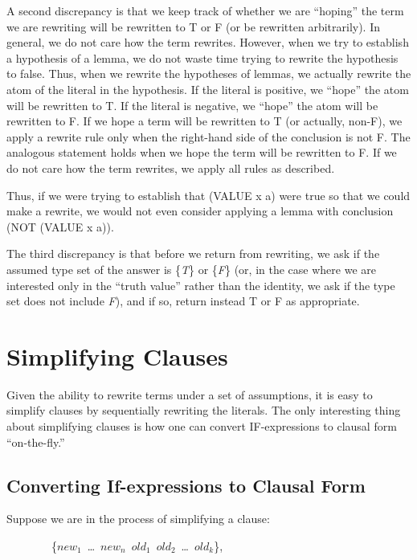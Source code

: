 \documentclass[11pt]{book}
\newenvironment{pubasis}{\begin{flushleft}\ttfamily\small}{\normalsize\rmfamily\end{flushleft}}
\newcommand{\pubinlineunderline}[1]{\emph{#1}}
\newcommand{\pubdefaulttextsize}{\large}
\begin{document}
A second discrepancy is that we
keep track of whether we are ``hoping'' the term we are rewriting will be
rewritten to T or F (or be rewritten arbitrarily).  In general, we do not
care how the term rewrites.  However, when we try to establish 
a hypothesis of a lemma, we do not waste time trying 
to rewrite the hypothesis to false.
Thus, when we rewrite the hypotheses of lemmas, we actually
rewrite the atom of the literal in the hypothesis.  If the literal is
positive, we ``hope'' the atom will be rewritten to T.  If the literal is
negative, we ``hope'' the atom will be rewritten to F.
If we hope a term will be rewritten to
T (or actually, non-F), we  apply a rewrite rule only 
when the right-hand side of the conclusion is not F.
The analogous statement holds when we hope the term
will be rewritten to F.  If we do not care how the term rewrites, we apply all rules
as described.

Thus, if we were trying to establish that (VALUE x a) were true so
that we could make a rewrite, we would not even consider applying a
lemma with conclusion (NOT (VALUE x a)).

The third discrepancy is that before we return from rewriting, we
ask if the assumed type set of the answer is \{\pubinlineunderline{T}\} or \{\pubinlineunderline{F}\} (or, in the case where we are  interested only
in the ``truth value'' rather than the identity, we ask if the type set
does not include \pubinlineunderline{F}), and if so, return
instead T or F as appropriate.
\section{Simplifying Clauses}
\pubdefaulttextsize
Given the ability to rewrite terms under a set of assumptions,
it is easy to simplify clauses by sequentially rewriting the literals.
The only interesting
thing about simplifying clauses is how
one can convert IF-expressions to clausal form ``on-the-fly.''
\subsection{Converting If-expressions to Clausal Form}
\pubdefaulttextsize
Suppose we are in the process of simplifying a clause:
\begin{pubasis}
~~~~~~~~\{$new_{1}$~\ldots{}~$new_{n}$~$old_{1}$~$old_{2}$~\ldots{}~$old_{k}$\},\\
\end{pubasis}
by rewriting each of the literals in it.  Suppose we have already
rewritten those to the left of $old_{1}$ and are now ready to rewrite
$old_{1}$ itself.
\end{document}
